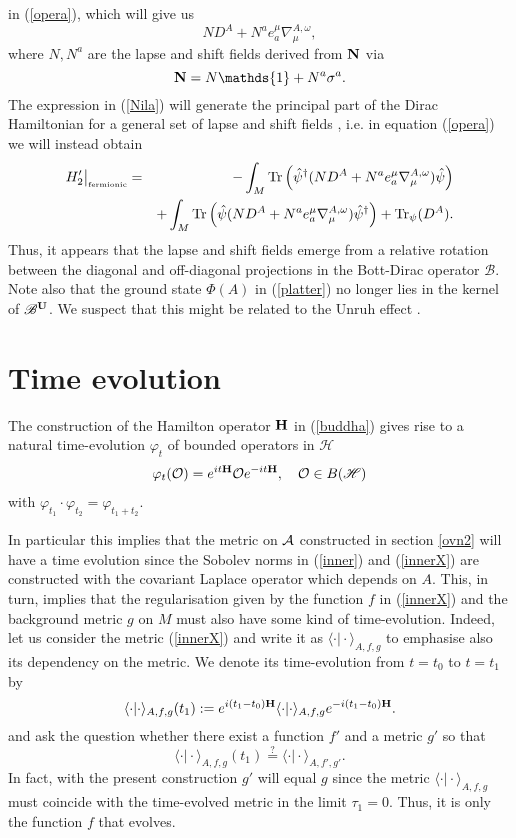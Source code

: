 \documentclass[letterpaper,11pt]{article}
\newcommand{\nn}{\nonumber}
\def\m{\mu}
\def\oo{\omega}
\def\ca{{\cal A}}
\def\co{{\cal O}}
\begin{document}
in (\ref{opera}), which will give us
\begin{equation}
N D^A + N^a e_a^\m \nabla^{A,\oo}_\m,
\label{Nila}
\end{equation}
where $N,N^a$ are the lapse and shift fields derived from ${\bf N}$ via
$$
{\bf N} = N \mathds{1} + N^a \sigma^a.
$$
The expression in (\ref{Nila}) will generate the principal part of the Dirac Hamiltonian for a general set of lapse and shift fields \cite{Paschke}, i.e. in equation (\ref{opera}) we will instead obtain 
\begin{eqnarray}
H'_2\big\vert_{\mbox{\tiny fermionic}} &=&   -\int_M  \mbox{Tr} \left(  \hat{\psi}^\dagger (ND^A +N^a e_a^\m \nabla^{A,\oo}_\m)  \hat{\psi}\right)  
\nn\\&&
+ \int_M  \mbox{Tr} \left(  \hat{\psi}   (ND^A +N^a e_a^\m \nabla^{A,\oo}_\m) \hat{\psi}^\dagger\right)
+ \mbox{Tr}_\psi(D^A).
\label{operaX}
\end{eqnarray}
Thus, it appears that the lapse and shift fields emerge from a relative rotation between the diagonal and off-diagonal projections in the Bott-Dirac operator $\mathscr{B} $.
Note also that the ground state $\Phi (A)$ in (\ref{platter}) no longer lies in the kernel of $\mathscr{B}^{\bf U}$. We suspect that this might be related to the Unruh effect \cite{Unruh:1976db}.




\section{Time evolution}
\label{sec-time}

The construction of the Hamilton operator ${\bf H}$ in (\ref{buddha}) gives rise to a natural time-evolution $\varphi_t $ of bounded operators in $\mathscr{H}$
\begin{eqnarray}
\varphi_t (\co) = e^{i t {\bf H}} \co e^{- i t {\bf H}} ,\quad \co \in B(\mathscr{H})
\end{eqnarray}
with $\varphi_{t_1}\cdot \varphi_{t_2} = \varphi_{t_1 + t_2}$.

In particular this implies that the metric on $\ca$ constructed in section \ref{ovn2} will have a time evolution since the Sobolev norms in (\ref{inner}) and (\ref{innerX}) are constructed with the covariant Laplace operator which depends on $A$. This, in turn, implies that the regularisation given by the function $f$ in (\ref{innerX}) and the background metric $g$ on $M$ must also have some kind of time-evolution.
Indeed, let us consider the metric (\ref{innerX}) and write it as $\langle \cdot \vert \cdot \rangle_{A,f,g}$ to emphasise also its dependency on the metric. We denote its time-evolution from $t=t_0$ to $t=t_1$ by
$$
\langle \cdot \vert \cdot\rangle_{A,f,g} (t_1) := e^{i (t_1-t_0) {\bf H}} \langle \cdot \vert \cdot\rangle_{A,f,g}  e^{- i (t_1-t_0) {\bf H}}.
$$
and ask the question whether there exist a function $f'$ and a metric $g'$ so that
$$
\langle \cdot \vert \cdot\rangle_{A,f,g} (t_1) \stackrel{?}{=} \langle \cdot \vert \cdot\rangle_{A,f',g'}.
$$
In fact, with the present construction $g'$ will equal $g$ since the metric $\langle \cdot \vert \cdot\rangle_{A,f,g} $ must coincide with the time-evolved metric in the limit $\tau_1=0$. Thus, it is only the function $f$ that evolves.
\end{document}
